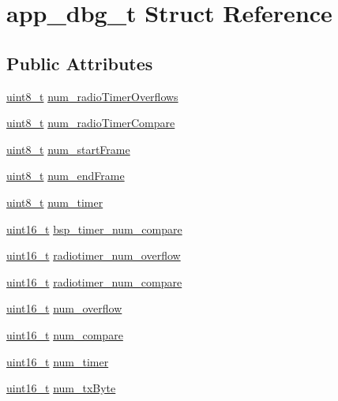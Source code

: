 \hypertarget{structapp__dbg__t}{}\section{app\+\_\+dbg\+\_\+t Struct Reference}
\label{structapp__dbg__t}
\subsection*{Public Attributes}
\begin{DoxyCompactItemize}
\item 
\hyperlink{_p_e___types_8h_aba7bc1797add20fe3efdf37ced1182c5}{uint8\+\_\+t} \hyperlink{structapp__dbg__t_add6dbed22a807e4123bc0373e0f68046}{num\+\_\+radio\+Timer\+Overflows}
\item 
\hyperlink{_p_e___types_8h_aba7bc1797add20fe3efdf37ced1182c5}{uint8\+\_\+t} \hyperlink{structapp__dbg__t_aef9a561afce385697dc10ecf1150c1d5}{num\+\_\+radio\+Timer\+Compare}
\item 
\hyperlink{_p_e___types_8h_aba7bc1797add20fe3efdf37ced1182c5}{uint8\+\_\+t} \hyperlink{structapp__dbg__t_a4bae1b438f9b04582f365da078b2d021}{num\+\_\+start\+Frame}
\item 
\hyperlink{_p_e___types_8h_aba7bc1797add20fe3efdf37ced1182c5}{uint8\+\_\+t} \hyperlink{structapp__dbg__t_a4e36c7d8e96db35973be86fcc36f17da}{num\+\_\+end\+Frame}
\item 
\hyperlink{_p_e___types_8h_aba7bc1797add20fe3efdf37ced1182c5}{uint8\+\_\+t} \hyperlink{structapp__dbg__t_a9c107485250f10b5eecb8a03bafabe98}{num\+\_\+timer}
\item 
\hyperlink{_p_e___types_8h_a1f1825b69244eb3ad2c7165ddc99c956}{uint16\+\_\+t} \hyperlink{structapp__dbg__t_a8854a5958fe805b60c7722d2c9be7ea0}{bsp\+\_\+timer\+\_\+num\+\_\+compare}
\item 
\hyperlink{_p_e___types_8h_a1f1825b69244eb3ad2c7165ddc99c956}{uint16\+\_\+t} \hyperlink{structapp__dbg__t_a96a5c82d676849aa222b1fc1915b0c83}{radiotimer\+\_\+num\+\_\+overflow}
\item 
\hyperlink{_p_e___types_8h_a1f1825b69244eb3ad2c7165ddc99c956}{uint16\+\_\+t} \hyperlink{structapp__dbg__t_af2f788aaca6b99724a5d0847d3a9a503}{radiotimer\+\_\+num\+\_\+compare}
\item 
\hyperlink{_p_e___types_8h_a1f1825b69244eb3ad2c7165ddc99c956}{uint16\+\_\+t} \hyperlink{structapp__dbg__t_ac0c63b6583f140e0966f2ff7d421cbfb}{num\+\_\+overflow}
\item 
\hyperlink{_p_e___types_8h_a1f1825b69244eb3ad2c7165ddc99c956}{uint16\+\_\+t} \hyperlink{structapp__dbg__t_aa14f3f8cab32b7c11b9cf565a6b792de}{num\+\_\+compare}
\item 
\hyperlink{_p_e___types_8h_a1f1825b69244eb3ad2c7165ddc99c956}{uint16\+\_\+t} \hyperlink{structapp__dbg__t_a770f6ecff698309585ae6576e63bc1db}{num\+\_\+timer}
\item 
\hyperlink{_p_e___types_8h_a1f1825b69244eb3ad2c7165ddc99c956}{uint16\+\_\+t} \hyperlink{structapp__dbg__t_ab63e981adf43dd108896ca45f76f238b}{num\+\_\+tx\+Byte}
\end{DoxyCompactItemize}


